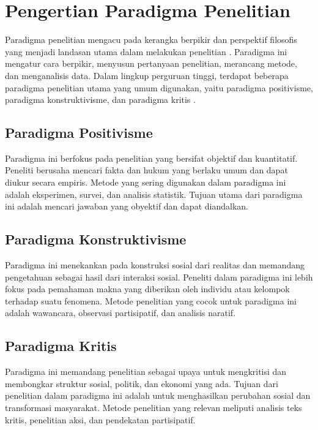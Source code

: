\section{Pengertian Paradigma Penelitian}
Paradigma penelitian mengacu pada kerangka berpikir dan perspektif filosofis yang menjadi landasan utama dalam melakukan penelitian \cite{denzin2011sage}. Paradigma ini mengatur cara berpikir, menyusun pertanyaan penelitian, merancang metode, dan menganalisis data. Dalam lingkup perguruan tinggi, terdapat beberapa paradigma penelitian utama yang umum digunakan, yaitu paradigma positivisme, paradigma konstruktivisme, dan paradigma kritis \cite{guba1994competing}.

\subsection{Paradigma Positivisme}
Paradigma ini berfokus pada penelitian yang bersifat objektif dan kuantitatif. Peneliti berusaha mencari fakta dan hukum yang berlaku umum dan dapat diukur secara empiris. Metode yang sering digunakan dalam paradigma ini adalah eksperimen, survei, dan analisis statistik. Tujuan utama dari paradigma ini adalah mencari jawaban yang obyektif dan dapat diandalkan.

\subsection{Paradigma Konstruktivisme}
Paradigma ini menekankan pada konstruksi sosial dari realitas dan memandang pengetahuan sebagai hasil dari interaksi sosial. Peneliti dalam paradigma ini lebih fokus pada pemahaman makna yang diberikan oleh individu atau kelompok terhadap suatu fenomena. Metode penelitian yang cocok untuk paradigma ini adalah wawancara, observasi partisipatif, dan analisis naratif.

\subsection{Paradigma Kritis}
Paradigma ini memandang penelitian sebagai upaya untuk mengkritisi dan membongkar struktur sosial, politik, dan ekonomi yang ada. Tujuan dari penelitian dalam paradigma ini adalah untuk menghasilkan perubahan sosial dan transformasi masyarakat. Metode penelitian yang relevan meliputi analisis teks kritis, penelitian aksi, dan pendekatan partisipatif.